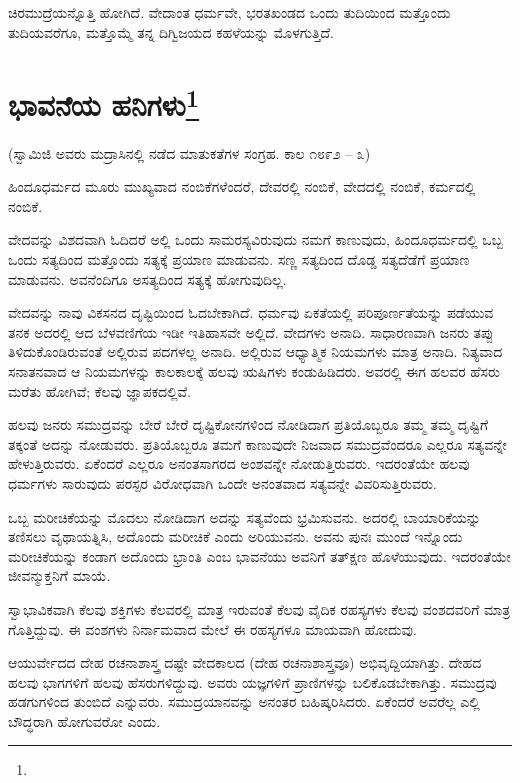 ಚಿರಮುದ್ರೆಯನ್ನೊತ್ತಿ ಹೋಗಿದೆ. ವೇದಾಂತ ಧರ್ಮವೇ, ಭರತಖಂಡದ ಒಂದು ತುದಿಯಿಂದ ಮತ್ತೊಂದು ತುದಿಯವರೆಗೂ, ಮತ್ತೊಮ್ಮೆ ತನ್ನ ದಿಗ್ವಿಜಯದ ಕಹಳೆಯನ್ನು ಮೊಳಗುತ್ತಿದೆ.

\newpage

\chapter[ಭಾವನೆಯ ಹನಿಗಳು]{ಭಾವನೆಯ ಹನಿಗಳು\protect\footnote{}}

\begin{center}
(ಸ್ವಾಮಿಜಿ ಅವರು ಮದ್ರಾಸಿನಲ್ಲಿ ನಡೆದ ಮಾತುಕತೆಗಳ ಸಂಗ್ರಹ. ಕಾಲ ೧೮೯೨ – ೩)
\end{center}

ಹಿಂದೂಧರ್ಮದ ಮೂರು ಮುಖ್ಯವಾದ ನಂಬಿಕೆಗಳೆಂದರೆ, ದೇವರಲ್ಲಿ ನಂಬಿಕೆ, ವೇದದಲ್ಲಿ ನಂಬಿಕೆ, ಕರ್ಮದಲ್ಲಿ ನಂಬಿಕೆ.

ವೇದವನ್ನು ವಿಶದವಾಗಿ ಓದಿದರೆ ಅಲ್ಲಿ ಒಂದು ಸಾಮರಸ್ಯವಿರುವುದು ನಮಗೆ ಕಾಣುವುದು, ಹಿಂದೂಧರ್ಮದಲ್ಲಿ ಒಬ್ಬ ಒಂದು ಸತ್ಯದಿಂದ ಮತ್ತೊಂದು ಸತ್ಯಕ್ಕೆ ಪ್ರಯಾಣ ಮಾಡುವನು. ಸಣ್ಣ ಸತ್ಯದಿಂದ ದೊಡ್ಡ ಸತ್ಯದೆಡೆಗೆ ಪ್ರಯಾಣ ಮಾಡುವನು. ಅವನೆಂದಿಗೂ ಅಸತ್ಯದಿಂದ ಸತ್ಯಕ್ಕೆ ಹೋಗುವುದಿಲ್ಲ.

ವೇದವನ್ನು ನಾವು ವಿಕಸನದ ದೃಷ್ಟಿಯಿಂದ ಓದಬೇಕಾಗಿದೆ. ಧರ್ಮವು ಏಕತೆಯಲ್ಲಿ ಪರಿಪೂರ್ಣತೆಯನ್ನು ಪಡೆಯುವ ತನಕ ಅದರಲ್ಲಿ ಆದ ಬೆಳವಣಿಗೆಯ ಇಡೀ ಇತಿಹಾಸವೇ ಅಲ್ಲಿದೆ. ವೇದಗಳು ಅನಾದಿ. ಸಾಧಾರಣವಾಗಿ ಜನರು ತಪ್ಪು ತಿಳಿದುಕೊಂಡಿರುವಂತೆ ಅಲ್ಲಿರುವ ಪದಗಳಲ್ಲ ಅನಾದಿ. ಅಲ್ಲಿರುವ ಆಧ್ಯಾತ್ಮಿಕ ನಿಯಮಗಳು ಮಾತ್ರ ಅನಾದಿ. ನಿತ್ಯವಾದ ಸನಾತನವಾದ ಆ ನಿಯಮಗಳನ್ನು ಕಾಲಕಾಲಕ್ಕೆ ಹಲವು ಋಷಿಗಳು ಕಂಡುಹಿಡಿದರು. ಅವರಲ್ಲಿ ಈಗ ಹಲವರ ಹೆಸರು ಮರೆತು ಹೋಗಿವೆ; ಕೆಲವು ಜ್ಞಾಪಕದಲ್ಲಿವೆ.

ಹಲವು ಜನರು ಸಮುದ್ರವನ್ನು ಬೇರೆ ಬೇರೆ ದೃಷ್ಟಿಕೋನಗಳಿಂದ ನೋಡಿದಾಗ ಪ್ರತಿಯೊಬ್ಬರೂ ತಮ್ಮ ತಮ್ಮ ದೃಷ್ಟಿಗೆ ತಕ್ಕಂತೆ ಅದನ್ನು ನೋಡುವರು. ಪ್ರತಿಯೊಬ್ಬರೂ ತಮಗೆ ಕಾಣುವುದೇ ನಿಜವಾದ ಸಮುದ್ರವೆಂದರೂ ಎಲ್ಲರೂ ಸತ್ಯವನ್ನೇ ಹೇಳುತ್ತಿರುವರು. ಏಕೆಂದರೆ ಎಲ್ಲರೂ ಅನಂತಸಾಗರದ ಅಂಶವನ್ನೇ ನೋಡುತ್ತಿರುವರು. ಇದರಂತೆಯೇ ಹಲವು ಧರ್ಮಗಳು ಸಾರುವುದು ಪರಸ್ಪರ ವಿರೋಧವಾಗಿ ಒಂದೇ ಅನಂತವಾದ ಸತ್ಯವನ್ನೇ ವಿವರಿಸುತ್ತಿರುವರು.

ಒಬ್ಬ ಮರೀಚಿಕೆಯನ್ನು ಮೊದಲು ನೋಡಿದಾಗ ಅದನ್ನು ಸತ್ಯವೆಂದು ಭ್ರಮಿಸುವನು. ಅದರಲ್ಲಿ ಬಾಯಾರಿಕೆಯನ್ನು ತಣಿಸಲು ವೃಥಾಯತ್ನಿಸಿ, ಅದೊಂದು ಮರೀಚಿಕೆ ಎಂದು ಅರಿಯುವನು. ಅವನು ಪುನಃ ಮುಂದೆ ಇನ್ನೊಂದು ಮರೀಚಿಕೆಯನ್ನು ಕಂಡಾಗ ಅದೊಂದು ಭ್ರಾಂತಿ ಎಂಬ ಭಾವನೆಯು ಅವನಿಗೆ ತತ್‌ಕ್ಷಣ ಹೊಳೆಯುವುದು. ಇದರಂತೆಯೇ ಜೀವನ್ಮುಕ್ತನಿಗೆ ಮಾಯೆ.

ಸ್ವಾಭಾವಿಕವಾಗಿ ಕೆಲವು ಶಕ್ತಿಗಳು ಕೆಲವರಲ್ಲಿ ಮಾತ್ರ ಇರುವಂತೆ ಕೆಲವು ವೈದಿಕ ರಹಸ್ಯಗಳು ಕೆಲವು ವಂಶದವರಿಗೆ ಮಾತ್ರ ಗೊತ್ತಿದ್ದುವು. ಈ ವಂಶಗಳು ನಿರ್ನಾಮವಾದ ಮೇಲೆ ಈ ರಹಸ್ಯಗಳೂ ಮಾಯವಾಗಿ ಹೋದುವು.

ಆಯುರ್ವೇದದ ದೇಹ ರಚನಾಶಾಸ್ತ್ರ  ದಷ್ಟೇ ವೇದಕಾಲದ (ದೇಹ ರಚನಾಶಾಸ್ತ್ರವೂ) ಅಭಿವೃದ್ದಿಯಾಗಿತ್ತು. ದೇಹದ ಹಲವು ಭಾಗಗಳಿಗೆ ಹಲವು ಹೆಸರುಗಳಿದ್ದುವು. ಅವರು ಯಜ್ಞಗಳಿಗೆ ಪ್ರಾಣಿಗಳನ್ನು ಬಲಿಕೊಡಬೇಕಾಗಿತ್ತು. ಸಮುದ್ರವು ಹಡಗುಗಳಿಂದ ತುಂಬಿದೆ ಎನ್ನುವರು. ಸಮುದ್ರಯಾನವನ್ನು ಅನಂತರ ಬಹಿಷ್ಕರಿಸಿದರು. ಏಕೆಂದರೆ ಅವರೆಲ್ಲ ಎಲ್ಲಿ ಬೌದ್ಧರಾಗಿ ಹೋಗುವರೋ ಎಂದು.

